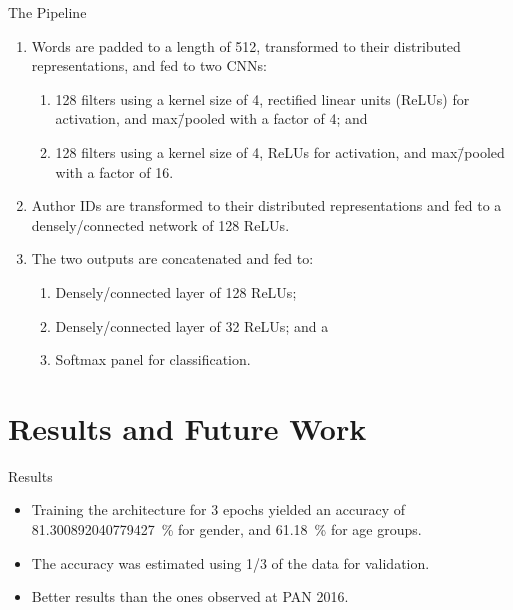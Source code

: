 \documentclass[usepdftitle=false]{beamer}
\begin{document}
\begin{frame}{The Pipeline}
  \begin{enumerate}
  \item Words are padded to a length of \num{512}, transformed to
    their distributed representations, and fed to two CNNs:
    \begin{enumerate}
    \item \num{128} filters using a kernel size of \num{4}, rectified
      linear units (ReLUs) for activation, and max\=/pooled with a
      factor of \num{4}; and
    \item \num{128} filters using a kernel size of \num{4}, ReLUs for
      activation, and max\=/pooled with a factor of \num{16}.
    \end{enumerate}
  \item Author IDs are transformed to their distributed
    representations and fed to a densely\-/connected network of
    \num{128} ReLUs.
  \item The two outputs are concatenated and fed to:
    \begin{enumerate}
    \item Densely\-/connected layer of \num{128} ReLUs;
    \item Densely\-/connected layer of \num{32} ReLUs; and a
    \item Softmax panel for classification.
    \end{enumerate}
  \end{enumerate}
\end{frame}

\section{Results and Future Work}

\begin{frame}{Results}
  \begin{itemize}
  \item Training the architecture for \num{3} epochs yielded an
    accuracy of \SI[round-mode=places,
    round-precision=2]{81.300892040779427}{\percent} for gender, and
    \SI[round-mode=places, round-precision=2]{61.18}{\percent} for age
    groups.
  \item The accuracy was estimated using \num{1/3} of the data for
    validation.
  \item Better results than the ones observed at PAN 2016.
  \end{itemize}
\end{frame}
\end{document}
